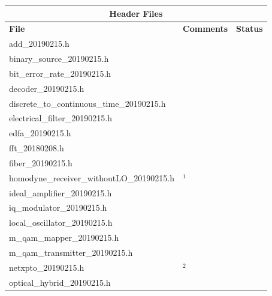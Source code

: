 	\begin{longtable}[h]{|l|l|l|}
		\hline
		\multicolumn{3}{|c|}{ \textbf{Header Files} } \\
		\hline
		\textbf{File}                                   & \textbf{Comments} & \textbf{Status} \\ \hline
		add\_20190215.h                                 &                   & 
		\checkmark \\ \hline
		binary\_source\_20190215.h                     &                   & 
		\checkmark \\ \hline
		bit\_error\_rate\_20190215.h                    &                   & 
		\checkmark \\ \hline
		decoder\_20190215.h                             &                   & 
		\checkmark \\ \hline
		discrete\_to\_continuous\_time\_20190215.h      &                   & 
		\checkmark \\ \hline
		electrical\_filter\_20190215.h                  &                   & 
		\checkmark \\\hline
		edfa\_20190215.h                                          
		&                   & 
		\checkmark \\ \hline
		fft\_20180208.h                                 &                   & \checkmark \\\hline
		fiber\_20190215.h                                         
		&                   & 
		\checkmark \\ \hline
		homodyne\_receiver\_withoutLO\_20190215.h                 & 
		$^{1}$            & 
		\checkmark \\ \hline
		ideal\_amplifier\_20190215.h                    &                   & 
		\checkmark \\ \hline
		iq\_modulator\_20190215.h                       &                   & 
		\checkmark \\ \hline
		local\_oscillator\_20190215.h                   &                   & 
		\checkmark \\ \hline
		m\_qam\_mapper\_20190215.h                      &                   & 
		\checkmark \\ \hline
		m\_qam\_transmitter\_20190215.h                 &                   & 
		\checkmark \\ \hline
		netxpto\_20190215.h                             & $^2$              & 
		\checkmark \\ \hline
		optical\_hybrid\_20190215.h                     &                   & 

\end{longtable}
